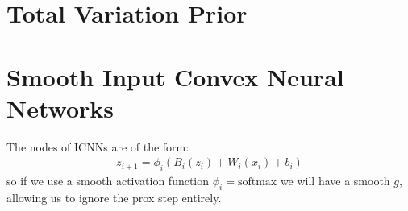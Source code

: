 \documentclass[a4paper,10pt]{article}
\numberwithin{equation}{section}
\numberwithin{thm}{section}
\begin{document}
 
\newpage
\section{Total Variation Prior}






\newpage
\section{Smooth Input Convex Neural Networks}

The nodes of ICNNs are of the form:
\begin{align*}
 z_{i+1} = \phi_i ( B_i (z_i) + W_i(x_i) + b_i)	
\end{align*}
so if we use a smooth activation function $\phi_i = \text{softmax}$ we will have a smooth $g$, allowing us to ignore the prox step entirely. 
\end{document}
